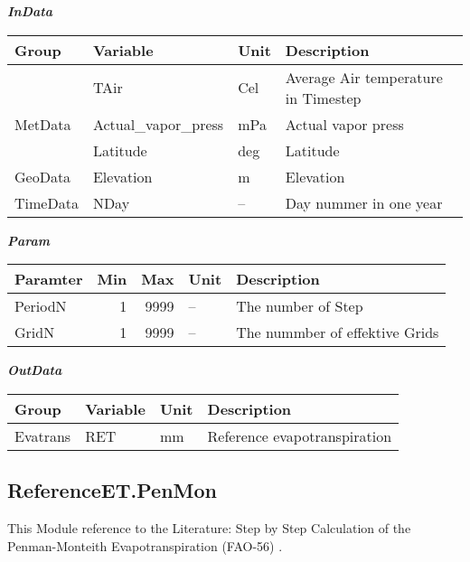 \documentclass[
]{book}
\begin{document}
\textbf{\emph{InData}}

\begin{table}[!h]
\centering
\begin{tabular}{l|l|l|l}
\hline
Group & Variable & Unit & Description\\
\hline
 & TAir & Cel & Average Air temperature in Timestep\\
\cline{2-4}
\multirow{-2}{*}{\raggedright\arraybackslash MetData} & Actual\_vapor\_press & mPa & Actual vapor press\\
\cline{1-4}
 & Latitude & deg & Latitude\\
\cline{2-4}
\multirow{-2}{*}{\raggedright\arraybackslash GeoData} & Elevation & m & Elevation\\
\cline{1-4}
TimeData & NDay & -- & Day nummer in one year\\
\hline
\end{tabular}
\end{table}

\textbf{\emph{Param}}

\begin{table}[!h]
\centering
\begin{tabular}{l|r|r|l|l}
\hline
Paramter & Min & Max & Unit & Description\\
\hline
PeriodN & 1 & 9999 & -- & The number of Step\\
\cline{1-5}
GridN & 1 & 9999 & -- & The nummber of effektive Grids\\
\hline
\end{tabular}
\end{table}

\textbf{\emph{OutData}}

\begin{table}[!h]
\centering
\begin{tabular}{l|l|l|l}
\hline
Group & Variable & Unit & Description\\
\hline
Evatrans & RET & mm & Reference evapotranspiration\\
\hline
\end{tabular}
\end{table}

\hypertarget{referenceet.penmon}{%
\subsection{ReferenceET.PenMon}\label{referenceet.penmon}}

This Module reference to the Literature: Step by Step Calculation of the Penman-Monteith Evapotranspiration (FAO-56) \citep{LincolnZotarelli.2014}.
\end{document}
